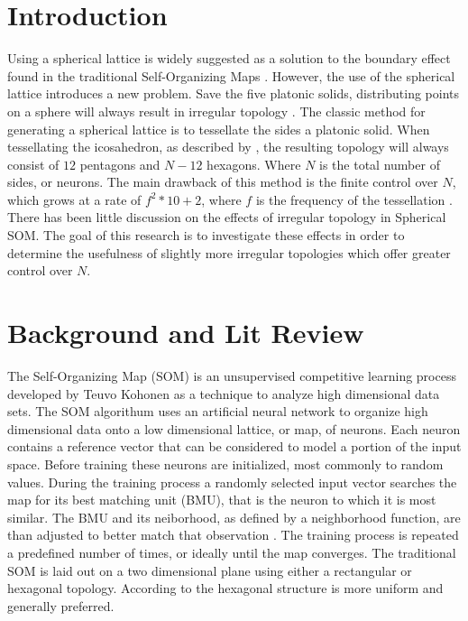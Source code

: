 \documentclass[11pt]{article}
\begin{document}
\section{Introduction}
Using a spherical lattice is widely suggested as a solution to the boundary
effect found in the traditional Self-Organizing Maps \citep{ritter99, boudjemai2003,
sangole03, Wu:2006lr, Nishio:2006fk}.  However, the use of the spherical lattice
introduces a new problem.  Save the five platonic solids, distributing points on
a sphere will always result in irregular topology \citep{ritter99}.  The classic
method for generating a spherical lattice is to tessellate the sides a platonic
solid.  When tessellating the icosahedron, as described by \cite{Wu:2006lr}, the
resulting topology will always consist of \(12\) pentagons and \(N-12\) hexagons.
Where \(N\) is the total number of sides, or neurons.  The main drawback of this
method is the finite control over \(N\), which grows at a rate of \(f^2*10+2\),
where \(f\) is the frequency of the tessellation \citep{Wu:2006lr}.  There has been
little discussion on the effects of irregular topology in Spherical SOM. The goal of
this research is to investigate these effects in order to determine the usefulness of
slightly more irregular topologies which offer greater control over \(N\).

\section{Background and Lit Review}
The Self-Organizing Map (SOM) is an unsupervised competitive learning process
developed by Teuvo Kohonen as a technique to analyze high dimensional data sets.
The SOM algorithum uses an artificial neural network to organize high
dimensional data onto a low dimensional lattice, or map, of neurons.  Each
neuron contains a reference vector that can be considered to model a portion of
the input space. Before training these neurons are initialized, most commonly to
random values.  During the training process a randomly selected input vector
searches the map for its best matching unit (BMU), that is the neuron to which
it is most similar. The BMU and its neiborhood, as defined by a neighborhood
function, are than adjusted to better match that observation
\citep{Kohonen2000}.  The training process is repeated a predefined number of
times, or ideally until the map converges.  The traditional SOM is laid out on a
two dimensional plane using either a rectangular or hexagonal topology.
According to \cite{Wu:2006lr} the hexagonal structure is more uniform and
generally preferred.
\end{document}
